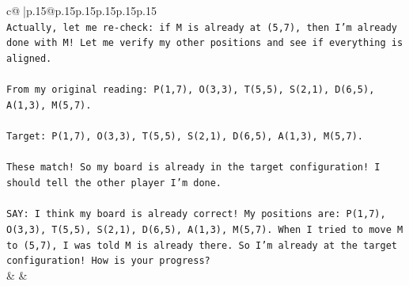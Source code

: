 \documentclass{article}
\begin{document}
{\begin{supertabular}{c@{$\;$}|p{.15\linewidth}@{}p{.15\linewidth}p{.15\linewidth}p{.15\linewidth}p{.15\linewidth}p{.15\linewidth}}
{{{\\ 
\texttt{Actually, let me re{-}check: if M is already at (5,7), then I'm already done with M! Let me verify my other positions and see if everything is aligned.} \\
\\ 
\texttt{From my original reading: P(1,7), O(3,3), T(5,5), S(2,1), D(6,5), A(1,3), M(5,7).} \\
\\ 
\texttt{Target: P(1,7), O(3,3), T(5,5), S(2,1), D(6,5), A(1,3), M(5,7).} \\
\\ 
\texttt{These match! So my board is already in the target configuration! I should tell the other player I'm done.} \\
\\ 
\texttt{SAY: I think my board is already correct! My positions are: P(1,7), O(3,3), T(5,5), S(2,1), D(6,5), A(1,3), M(5,7). When I tried to move M to (5,7), I was told M is already there. So I'm already at the target configuration! How is your progress?} \\
            }
        }
    }
    & & \\ \\


\end{supertabular}}
\end{document}
